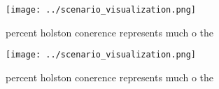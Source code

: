 \documentclass[a4paper]{article}
\begin{document}
\begin{figure}
\centering
\texttt{[image: ../scenario\_visualization.png]}
\caption{ percent holston conerence represents much o the 
}
\end{figure}
 
\begin{figure}
\centering
\texttt{[image: ../scenario\_visualization.png]}
\caption{ percent holston conerence represents much o the 
}
\end{figure}
 
\end{document}
